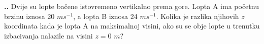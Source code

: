 
\noindent 
\textbf{
\thecjelina.\thezadatak.}
Dvije su lopte bačene istovremeno vertikalno prema gore. Lopta A ima početnu brzinu iznosa 20 $ms^{-1} $, a lopta B iznosa 24 $ms^{-1} $. Kolika je razlika njihovih $z$ koordinata kada je lopta A na maksimalnoj visini, ako su se obje lopte u trenutku izbacivanja nalazile na visini $z=0$ $m$?


